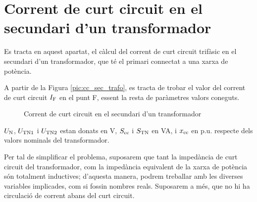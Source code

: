 \section{Corrent de curt circuit en el  secundari d'un transformador}

 Es tracta en aquest apartat, el c\`{a}lcul del corrent de curt
circuit trif\`{a}sic en el secundari d'un transformador, que t\'{e} el
primari connectat  a una xarxa de pot\`{e}ncia.

A partir de la Figura \vref{pic:cc_sec_trafo}, es tracta de trobar
el valor del corrent de curt circuit $I_\mathrm{F}$ en el punt F, essent
la resta de par\`{a}metres valors coneguts.

\begin{figure}[htb]
\vspace{3mm} \centering {} \caption{Corrent de curt circuit en el  secundari d'un
transformador} \label{pic:cc_sec_trafo}
\end{figure}

$U_\mathrm{N}$, $U_\mathrm{TN1}$ i $U_\mathrm{TN2}$ estan donats en V,
$S_\mathrm{cc}$ i $S_\mathrm{TN}$ en VA, i $x_\mathrm{cc}$ en p.u. respecte dels
valors nominals del transformador.


Per tal de simplificar el problema, suposarem que tant la imped\`{a}ncia
de curt circuit del transformador, com la imped\`{a}ncia equivalent de
la xarxa de pot\`{e}ncia s\'{o}n totalment inductives; d'aquesta manera,
podrem treballar amb les diverses variables implicades, com si
fossin nombres reals. Suposarem a m\'{e}s, que no hi ha circulaci\'{o} de
corrent abans del curt circuit.

